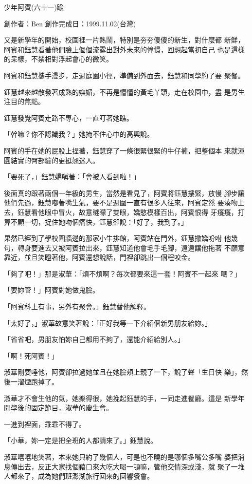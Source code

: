 



少年阿賓(六十一)踰

創作者：Ben
創作完成日：1999.11.02(台灣)


又是新學年的開始，校園裡一片熱鬧，特別是夯夯傻傻的新生，對什麼都
新鮮，阿賓和鈺慧看著他們臉上個個流露出對外未來的憧憬，回想起當初自己
也是這樣的呆樣，不禁相對浮起會心的微笑。

阿賓和鈺慧攜手漫步，走過庭園小徑，準備到外面去，鈺慧和同學約了要
聚餐。

鈺慧越來越散發著成熟的嫵媚，不再是懵懂的黃毛丫頭，走在校園中，盡
是男生注目的焦點。

鈺慧發覺阿賓走路不專心，一直盯著她瞧。

「幹嘛？你不認識我？」她掩不住心中的高興說。

阿賓的手在她的屁股上捏著，鈺慧穿了一條很緊很緊的牛仔褲，把整個本
來就渾圓結實的臀部繃的更挺翹迷人。

「要死了，」鈺慧嬌嗔著：「會被人看到啦！」

後面真的跟著兩個一年級的男生，當然是看見了，阿賓將鈺慧摟緊，放慢
腳步讓他們先過，鈺慧嘟著嘴生氣，要不是週圍一直有很多人往來，阿賓定然
要湊吻上去，鈺慧看他眼中冒火，故意瞇矇了雙眼，嬌憨模樣百出，阿賓恨得
牙癢癢，打算不顧一切，捉住她吻個痛快，鈺慧卻說：「好了，我到了。」

果然已經到了學校圍牆邊的那家小牛排館，阿賓站在門外，鈺慧撒嬌吩咐
他幾句，轉身要進去又被阿賓拉出來，鈺慧知道他會毛手毛腳，遠遠讓他拖著
不願意靠近，並且笑瞪著他，阿賓還想說話，門裡卻跳出一個程咬金。

「夠了吧！」那是淑華：「煩不煩啊？每次都要來這一套！阿賓不一起來
嗎？」

「要妳管！」阿賓對她做鬼臉。

「阿賓科上有事，另外有聚會。」鈺慧替他解釋。

「太好了，」淑華故意笑著說：「正好我等一下介紹個新男朋友給妳。」

「省省吧，男朋友怕妳自己都用不夠了，還能介紹給別人。」

「啊！死阿賓！」

淑華剛要唾他，阿賓卻拉過她並且在她臉頰上親了一下，說了聲「生日快
樂」，然後一溜煙跑掉了。

淑華才不會生他的氣，她樂得很，她挽起鈺慧的手，一同走進餐廳。這是
新學年開學後的固定節目，淑華的慶生會。

一進到裡面，乖乖不得了。

「小華，妳一定是把全班的人都請來了。」鈺慧說。

淑華嘻嘻地笑著，本來她只約了幾個人，可是也不曉的是哪個多嘴公多嘴
婆把消息傳出去，反正大家找個藉口來大吃大喝一頓嘛，管他交情深或淺，就
聚了一堆人都來了，成為她們班澎湖旅行回來的回響餐會。

